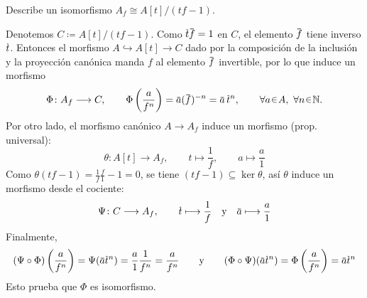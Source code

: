 \begin{ejer}
Describe un isomorfismo $A_f\cong A[t]/(tf-1)$.
\end{ejer}
\begin{sol}
Denotemos $C\coloneq A[t]/(tf-1)$. Como $\ubar t\ubar f=1$ en $C$, el elemento $\ubar f$ tiene inverso $\ubar t$. Entonces el morfismo $A\hookrightarrow A[t]\to C$ dado por la composición de la inclusión y la proyección canónica manda $f$ al elemento $\ubar f$ invertible, por lo que induce un morfismo
\[
\Phi\colon A_f\longrightarrow C,
\qquad
\Phi\left(\frac{a}{f^n}\right)=\ubar a(\ubar f)^{-n}=\ubar a\,\ubar t^n,
\qquad \forall a\en A,\ \forall n\en\mathbb{N}.
\]
Por otro lado, el morfismo canónico $A\to A_f$ induce un morfismo (prop. universal):
\[
\theta\colon A[t]\longrightarrow A_f,
\qquad
t\longmapsto\frac{1}{f},
\qquad
a\longmapsto\frac{a}{1}
\]
Como $\theta(tf-1)=\frac{1}{f}\frac{f}{1}-1=0$, se tiene $(tf-1)\subseteq\ker\theta$, así $\theta$ induce un morfismo desde el cociente:
\[
\Psi\colon C\longrightarrow A_f,
\qquad
\ubar t\longmapsto\frac{1}{f}
\quad\text{y}\quad
\ubar a\longmapsto\frac{a}{1}
\]
Finalmente,
\[
(\Psi\circ\Phi)\left(\frac{a}{f^n}\right)
=\Psi(\ubar a\ubar t^n)
=\frac{a}{1}\frac{1}{f^n}
=\frac{a}{f^n}
\qquad\text{y}\qquad
(\Phi\circ\Psi)(\ubar a\ubar t^n)
=\Phi\left(\frac{a}{f^n}\right)
=\ubar a\ubar t^n
\]
Esto prueba que $\Phi$ es isomorfismo.
\end{sol}
